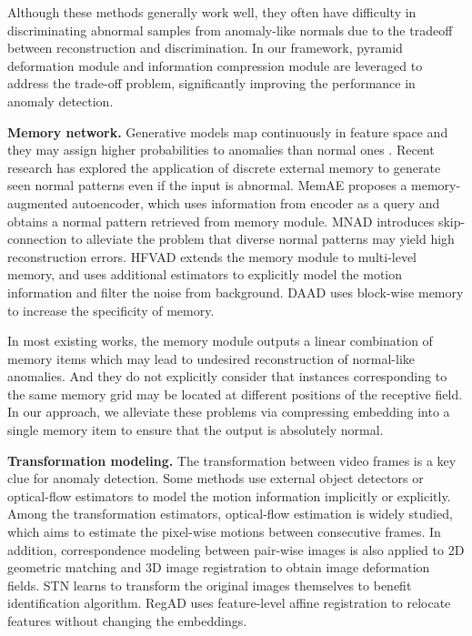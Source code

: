 \documentclass[10pt,twocolumn,letterpaper]{article}
\begin{document}
    Although these methods generally work well, they often have difficulty in discriminating abnormal samples from anomaly-like normals due to the tradeoff between reconstruction and discrimination. In our framework, pyramid deformation module and information compression module are leveraged to address the trade-off problem, significantly improving the performance in anomaly detection.

    \textbf{Memory network.}
    Generative models map continuously in feature space and they may assign higher probabilities to anomalies than normal ones \cite{dontknow}. Recent research \cite{memae,mnad,hf2vad,daad} has explored the application of discrete external memory to generate seen normal patterns even if the input is abnormal. MemAE \cite{memae} proposes a memory-augmented autoencoder, which uses information from encoder as a query and obtains a normal pattern retrieved from memory module. MNAD \cite{mnad} introduces skip-connection to alleviate the problem that diverse normal patterns may yield high reconstruction errors. HFVAD \cite{hf2vad} extends the memory module to multi-level memory, and uses additional estimators \cite{cascadercnn, flownet} to explicitly model the motion information and filter the noise from background. DAAD \cite{daad} uses block-wise memory to increase the specificity of memory.

    In most existing works, the memory module outputs a linear combination of memory items which may lead to undesired reconstruction of normal-like anomalies. And they do not explicitly consider that instances corresponding to the same memory grid may be located at different positions of the receptive field. In our approach, we alleviate these problems via compressing embedding into a single memory item to ensure that the output is absolutely normal.

    \textbf{Transformation modeling.}
    The transformation between video frames is a key clue for anomaly detection. Some methods \cite{hf2vad,framepred,ssml,ocae} use external object detectors or optical-flow estimators to model the motion information implicitly or explicitly. Among the transformation estimators, optical-flow estimation \cite{flownet} is widely studied, which aims to estimate the pixel-wise motions between consecutive frames. In addition, correspondence modeling between pair-wise images is also applied to 2D geometric matching \cite{match2d} and 3D image registration \cite{reg3d} to obtain image deformation fields. STN \cite{stn} learns to transform the original images themselves to benefit identification algorithm. RegAD \cite{regad} uses feature-level affine registration to relocate features without changing the embeddings.
\end{document}
